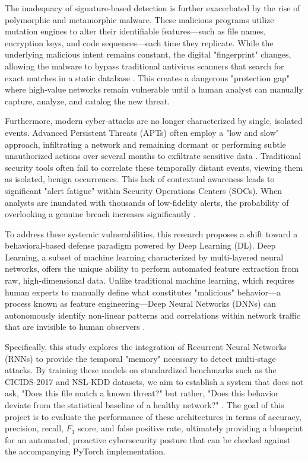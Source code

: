 \documentclass[10pt, conference, compsocconf, letterpaper, twocolumn, twoside]{IEEEtran}
\begin{document}
The inadequacy of signature-based detection is further exacerbated by the rise of polymorphic and metamorphic malware. These malicious programs utilize mutation engines to alter their identifiable features—such as file names, encryption keys, and code sequences—each time they replicate. While the underlying malicious intent remains constant, the digital "fingerprint" changes, allowing the malware to bypass traditional antivirus scanners that search for exact matches in a static database \cite{idika2007}. This creates a dangerous "protection gap" where high-value networks remain vulnerable until a human analyst can manually capture, analyze, and catalog the new threat.

Furthermore, modern cyber-attacks are no longer characterized by single, isolated events. Advanced Persistent Threats (APTs) often employ a "low and slow" approach, infiltrating a network and remaining dormant or performing subtle unauthorized actions over several months to exfiltrate sensitive data \cite{alshamrani2019}. Traditional security tools often fail to correlate these temporally distant events, viewing them as isolated, benign occurrences. This lack of contextual awareness leads to significant "alert fatigue" within Security Operations Centers (SOCs). When analysts are inundated with thousands of low-fidelity alerts, the probability of overlooking a genuine breach increases significantly \cite{axelsson2000}.

To address these systemic vulnerabilities, this research proposes a shift toward a behavioral-based defense paradigm powered by Deep Learning (DL). Deep Learning, a subset of machine learning characterized by multi-layered neural networks, offers the unique ability to perform automated feature extraction from raw, high-dimensional data. Unlike traditional machine learning, which requires human experts to manually define what constitutes "malicious" behavior—a process known as feature engineering—Deep Neural Networks (DNNs) can autonomously identify non-linear patterns and correlations within network traffic that are invisible to human observers \cite{lecun2015}.

Specifically, this study explores the integration of Recurrent Neural Networks (RNNs) to provide the temporal "memory" necessary to detect multi-stage attacks. By training these models on standardized benchmarks such as the CICIDS-2017 and NSL-KDD datasets, we aim to establish a system that does not ask, "Does this file match a known threat?" but rather, "Does this behavior deviate from the statistical baseline of a healthy network?" \cite{sharafaldin2018}. The goal of this project is to evaluate the performance of these architectures in terms of accuracy, precision, recall, $F_1$ score, and false positive rate, ultimately providing a blueprint for an automated, proactive cybersecurity posture that can be checked against the accompanying PyTorch implementation.
\end{document}
